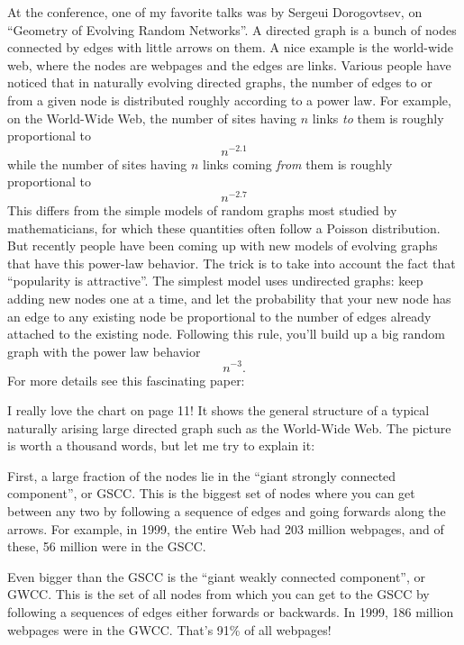 \documentclass{article}
\def\tightlist{}
\renewcommand{\texttt}[1]{%
  \begingroup
  \ttfamily
  \begingroup\lccode`~=`/\lowercase{\endgroup\def~}{/\discretionary{}{}{}}%
  \begingroup\lccode`~=`[\lowercase{\endgroup\def~}{[\discretionary{}{}{}}%
  \begingroup\lccode`~=`.\lowercase{\endgroup\def~}{.\discretionary{}{}{}}%
  \catcode`/=\active\catcode`[=\active\catcode`.=\active
  \scantokens{#1\noexpand}%
  \endgroup
}
\begin{document}
At the conference, one of my favorite talks was by Sergeui Dorogovtsev,
on ``Geometry of Evolving Random Networks''. A directed graph is a bunch
of nodes connected by edges with little arrows on them. A nice example
is the world-wide web, where the nodes are webpages and the edges are
links. Various people have noticed that in naturally evolving directed
graphs, the number of edges to or from a given node is distributed
roughly according to a power law. For example, on the World-Wide Web,
the number of sites having \(n\) links \emph{to} them is roughly
proportional to \[n^{-2.1}\] while the number of sites having \(n\)
links coming \emph{from} them is roughly proportional to \[n^{-2.7}\]
This differs from the simple models of random graphs most studied by
mathematicians, for which these quantities often follow a Poisson
distribution. But recently people have been coming up with new models of
evolving graphs that have this power-law behavior. The trick is to take
into account the fact that ``popularity is attractive''. The simplest
model uses undirected graphs: keep adding new nodes one at a time, and
let the probability that your new node has an edge to any existing node
be proportional to the number of edges already attached to the existing
node. Following this rule, you'll build up a big random graph with the
power law behavior \[n^{-3}.\] For more details see this fascinating
paper:


I really love the chart on page 11! It shows the general structure of a
typical naturally arising large directed graph such as the World-Wide
Web. The picture is worth a thousand words, but let me try to explain
it:

First, a large fraction of the nodes lie in the ``giant strongly
connected component'', or GSCC. This is the biggest set of nodes where
you can get between any two by following a sequence of edges and going
forwards along the arrows. For example, in 1999, the entire Web had 203
million webpages, and of these, 56 million were in the GSCC.

Even bigger than the GSCC is the ``giant weakly connected component'',
or GWCC. This is the set of all nodes from which you can get to the GSCC
by following a sequences of edges either forwards or backwards. In 1999,
186 million webpages were in the GWCC. That's 91\% of all webpages!
\end{document}
